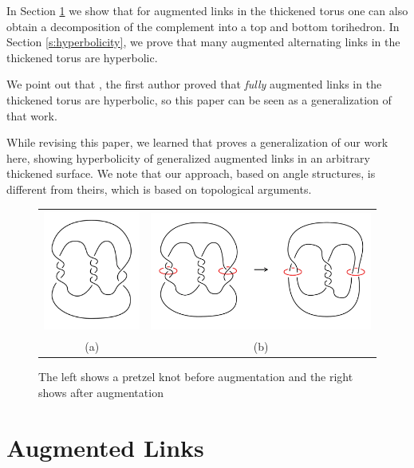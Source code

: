 \documentclass[11pt]{amsart}
\newcommand{\secref}[1]{Section \ref{#1}}
\theoremstyle{plain}
\theoremstyle{definition}
\begin{document}
In \secref{s:auglinks} we show that for augmented
links in the thickened torus one can also obtain a decomposition of the
complement into a top and bottom torihedron.  In \secref{s:hyperbolicity}, we
prove that many augmented alternating links in the thickened torus are
hyperbolic.


We point out that \cite{kwon2020fully}, the first author
proved that \emph{fully} augmented links in the thickened torus
are hyperbolic, so this paper can be seen as a generalization
of that work.


While revising this paper,
we learned that \cite{adams2021generalized}
proves a generalization of our work here,
showing hyperbolicity of generalized augmented links
in an arbitrary thickened surface.
We note that our approach, based on angle structures,
is different from theirs, which is based on topological arguments.



 \begin{figure}
 \centering  
 \begin{tabular}{cc}
 \includegraphics [height=4cm]{augmentation1.png}&
  \includegraphics [height=4cm]{augmentation2.png}\\
  (a)&(b)
  \end{tabular}
 \caption{The left shows a pretzel knot before augmentation and the right shows after augmentation}
 \label{fig:augmentationS3}
 \end{figure}
 
 
\section{Augmented Links}
\label{s:auglinks}
\end{document}
